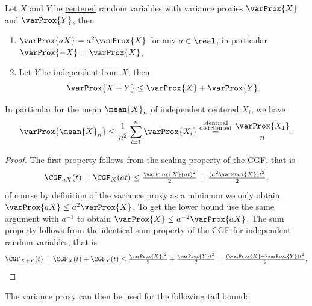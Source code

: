 \begin{lemma}
    Let \(X\) and \(Y\) be \underline{centered} random variables with variance proxies \(\varProx{X}\) and \(\varProx{Y}\), then
    \begin{enumerate}[label=(\roman*), noitemsep]
        \item\label{it: var proxy scaling} \(\varProx{a X} = a^2 \varProx{X}\) for any \(a\in \real\), in particular \(\varProx{-X} = \varProx{X}\),
        \item\label{it: variance proxy independent sums} Let \(Y\) be \underline{independent} from \(X\), then
        \[
            \varProx{X+Y} \le \varProx{X} + \varProx{Y}.
        \]
    \end{enumerate}
    In particular for the mean \(\mean{X}_n\) of independent centered \(X_i\),
    we have
    \begin{equation}
        \label{eq: variance proxy of the mean}
        \varProx{\mean{X}_n} \le \frac1{n^2} \sum_{i=1}^n \varProx{X_i}
        \overset{\substack{\text{identical}\\\text{distributed}}}= \frac{\varProx{X_1}}n.
    \end{equation}
\end{lemma}
\begin{proof}
    The first property follows from the scaling property of the CGF, that is
    \[
        \CGF_{a X}(t) = \CGF_X(a t) \le \tfrac{\varProx{X} (a t)^2}2 = \tfrac{(a^2 \varProx{X}) t^2}2.
    \]
    of course by definition of the variance proxy as a minimum we only obtain
    \(\varProx{aX} \le a^2 \varProx{X}\). To get the lower bound use the same
    argument with \(a^{-1}\) to obtain \(\varProx{X} \le a^{-2} \varProx{aX}\).
    The sum property follows from the identical
    sum property of the CGF for independent random variables, that is
    \[
        \CGF_{X+Y}(t) = \CGF_X(t) + \CGF_Y(t) \le \tfrac{\varProx{X} t^2}2 + \tfrac{\varProx{Y} t^2}2 = \tfrac{(\varProx{X} + \varProx{Y}) t^2}2.
        \qedhere
    \]

\end{proof}

The variance proxy can then be used for the following tail bound:

